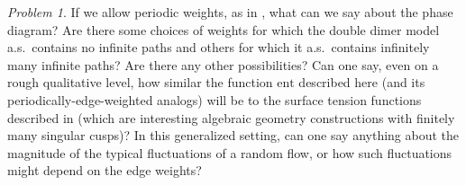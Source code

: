 \documentclass[11pt]{article}
\theoremstyle{remark}
\newtheorem{problem}[thm]{Problem}
\theoremstyle{definition}
\newcommand{\ent}{\text{ent}}
\begin{document}
\begin{problem}
If we allow periodic weights, as in \cite{kenyon2006dimers}, what can we say about the phase diagram? Are there some choices of weights for which the double dimer 
model a.s.\ contains no infinite paths and others for which it a.s.\ contains infinitely many infinite paths? Are there any other possibilities? Can one say, even on a rough qualitative level, how similar the function $\ent$ described here (and its periodically-edge-weighted analogs) will be to the surface tension functions described in \cite{kenyon2006dimers} (which are interesting algebraic geometry constructions with finitely many singular cusps)? In this generalized setting, can one say anything about the magnitude of the typical fluctuations of a random flow, or how such fluctuations might depend on the edge weights?
\end{problem}






\printindex
\end{document}
